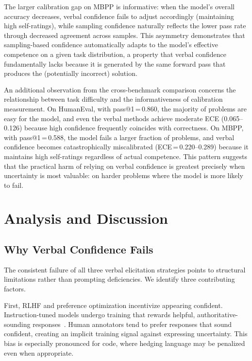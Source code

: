 \documentclass{article}
\begin{document}
The larger calibration gap on MBPP is informative: when the model's overall accuracy decreases, verbal confidence fails to adjust accordingly (maintaining high self-ratings), while sampling confidence naturally reflects the lower pass rate through decreased agreement across samples. This asymmetry demonstrates that sampling-based confidence automatically adapts to the model's effective competence on a given task distribution, a property that verbal confidence fundamentally lacks because it is generated by the same forward pass that produces the (potentially incorrect) solution.

An additional observation from the cross-benchmark comparison concerns the relationship between task difficulty and the informativeness of calibration measurement. On HumanEval, with pass@1\,=\,0.860, the majority of problems are easy for the model, and even the verbal methods achieve moderate ECE (0.065--0.126) because high confidence frequently coincides with correctness. On MBPP, with pass@1\,=\,0.588, the model fails a larger fraction of problems, and verbal confidence becomes catastrophically miscalibrated (ECE\,=\,0.220--0.289) because it maintains high self-ratings regardless of actual competence. This pattern suggests that the practical harm of relying on verbal confidence is greatest precisely when uncertainty is most valuable: on harder problems where the model is more likely to fail.

\section{Analysis and Discussion}
\label{sec:discussion}

\subsection{Why Verbal Confidence Fails}
\label{sec:why_verbal}

The consistent failure of all three verbal elicitation strategies points to structural limitations rather than prompting deficiencies. We identify three contributing factors.

First, RLHF and preference optimization incentivize appearing confident. Instruction-tuned models undergo training that rewards helpful, authoritative-sounding responses~\citep{tian2023just}. Human annotators tend to prefer responses that sound confident, creating an implicit training signal against expressing uncertainty. This bias is especially pronounced for code, where hedging language may be penalized even when appropriate.
\end{document}
